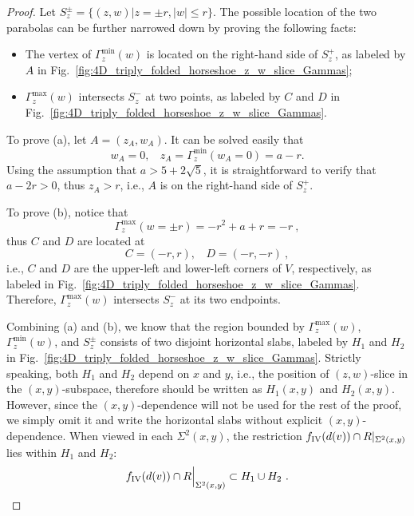 \documentclass[12pt]{iopart}
\begin{document}
\begin{proof}
Let $S^{\pm}_z = \lbrace (z,w) | z=\pm r, |w|\leq r \rbrace$. The possible location of the two parabolas can be further narrowed down by proving the following facts:
\begin{itemize}
\item[(a)] The vertex of $\Gamma^{\min}_z(w)$ is located on the right-hand side of $S^+_z$, as labeled by $A$ in Fig.~\ref{fig:4D_triply_folded_horseshoe_z_w_slice_Gammas};
\item[(b)] $\Gamma^{\max}_z(w)$ intersects $S^-_z$ at two points, as labeled by $C$ and $D$ in Fig.~\ref{fig:4D_triply_folded_horseshoe_z_w_slice_Gammas}. 
\end{itemize} 

To prove (a), let $A=(z_A,w_A)$. It can be solved easily that
\begin{equation}
w_A=0, ~~~~ z_A = \Gamma^{\min}_z(w_A=0)=a-r. 
\end{equation}
Using the assumption that $a>5+2\sqrt{5}$, it is straightforward to verify that $a-2r>0$, thus $z_A >r$, i.e., $A$ is on the right-hand side of $S^{+}_z$. 

To prove (b), notice that
\begin{equation}
\Gamma^{\max}_z(w=\pm r) = -r^2 +a +r = -r\ ,
\end{equation}
thus $C$ and $D$ are located at
\begin{equation}
C = (-r,r), ~~~~ D=(-r,-r)\ ,
\end{equation}
i.e., $C$ and $D$ are the upper-left and lower-left corners of $V$, respectively, as labeled in Fig.~\ref{fig:4D_triply_folded_horseshoe_z_w_slice_Gammas}. Therefore, $\Gamma^{\max}_z(w)$ intersects $S^-_z$ at its two endpoints. 

Combining (a) and (b), we know that the region bounded by $\Gamma^{\max}_z(w)$, $\Gamma^{\min}_z(w)$, and $S^{\pm}_z$ consists of two disjoint horizontal slabs, labeled by $H_1$ and $H_2$ in Fig.~\ref{fig:4D_triply_folded_horseshoe_z_w_slice_Gammas}. Strictly speaking, both $H_1$ and $H_2$ depend on $x$ and $y$, i.e., the position of $(z,w)$-slice in the $(x,y)$-subspace, therefore should be written as $H_1(x,y)$ and $H_2(x,y)$. However, since the $(x,y)$-dependence will not be used for the rest of the proof, we simply omit it and write the horizontal slabs without explicit $(x,y)$-dependence. When viewed in each $\Sigma^2(x,y)$, the restriction $f_{\rm IV}(d(v))\cap R|_{\Sigma^2(x,y)}$ lies within $H_1$ and $H_2$:
\begin{equation}\label{eq:V intersects f V V z w slice first bound}
f_{\rm IV}(d(v))\cap R \Big|_{\Sigma^2(x,y)} \subset H_1 \cup H_2 \ .
\end{equation}


\end{proof}
\end{document}
